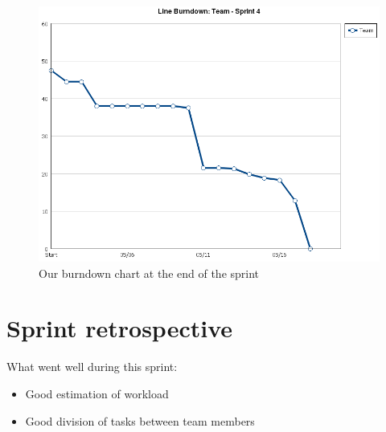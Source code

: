 \documentclass[a4paper,11pt]{article}
\begin{document}
 \begin{figure}[ht!]
 	\begin{center}
 	\includegraphics[width=\textwidth]{line_burndown.png}		
 	\end{center}
 	\caption{Our burndown chart at the end of the sprint}
 	\label{burndown}
 \end{figure}

%
%

\clearpage

\section{Sprint retrospective}

What went well during this sprint:

\begin{itemize}
\item Good estimation of workload
\item Good division of tasks between team members
\end{itemize}
\end{document}
